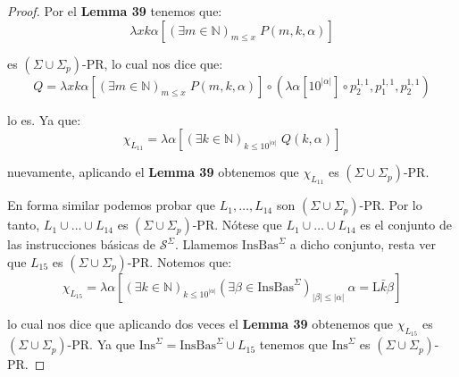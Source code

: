 \begin{proof}
    \PN Por el \textbf{Lemma 39} tenemos que:
    \[
      \lambda xk\alpha \left[(\exists m \in \mathbb{N})_{m\leq x} \; P(m,k,\alpha) \right]
    \]

    \PN es $(\Sigma \cup \Sigma_{p})$-PR, lo cual nos dice que:
    \[
      Q = \lambda xk\alpha \left[(\exists m \in \mathbb{N})_{m\leq x} \; P(m,k,\alpha) \right] \circ (\lambda \alpha
      \left[10^{\lvert \alpha \rvert}\right] \circ p_{2}^{1,1},p_{1}^{1,1},p_{2}^{1,1})
    \]

    \PN lo es. Ya que:
    \[
      \chi_{L_{11}} = \lambda \alpha \left[(\exists k \in \mathbb{N})_{k \leq 10^{\lvert \alpha \rvert}} \; Q(k,\alpha)
      \right]
    \]

    \PN nuevamente, aplicando el \textbf{Lemma 39} obtenemos que $\chi_{L_{11}}$ es $(\Sigma \cup \Sigma_{p})$-PR.

    \PN En forma similar podemos probar que $L_{1}, \dotsc, L_{14}$ son $(\Sigma \cup \Sigma_{p})$-PR. Por lo tanto,
    $L_{1} \cup \dotsc \cup L_{14}$ es $(\Sigma \cup \Sigma_{p})$-PR. Nótese que $L_{1} \cup \dotsc \cup L_{14}$ es el
    conjunto de las instrucciones básicas de $\mathcal{S}^{\Sigma}$. Llamemos $\mathrm{InsBas}^{\Sigma}$ a dicho
    conjunto, resta ver que $L_{15}$ es $(\Sigma \cup \Sigma_{p})$-PR. Notemos que:
    \[
      \chi_{L_{15}}=\lambda \alpha \left[ (\exists k\in \mathbb{N})_{k\leq 10^{\lvert \alpha \rvert}}(\exists \beta \in
      \mathrm{InsBas}^{\Sigma})_{\lvert \beta \rvert \leq \lvert \alpha \rvert} \ \alpha = \mathrm{L}\bar{k}\beta\right]
    \]

    \PN lo cual nos dice que aplicando dos veces el \textbf{Lemma 39} obtenemos que $\chi_{L_{15}}$ es $(\Sigma \cup
    \Sigma_{p})$-PR. Ya que $\mathrm{Ins}^{\Sigma} = \mathrm{InsBas}^{\Sigma} \cup L_{15}$ tenemos que
    $\mathrm{Ins}^{\Sigma}$ es $(\Sigma \cup \Sigma_{p})$-PR.
  \end{proof}

